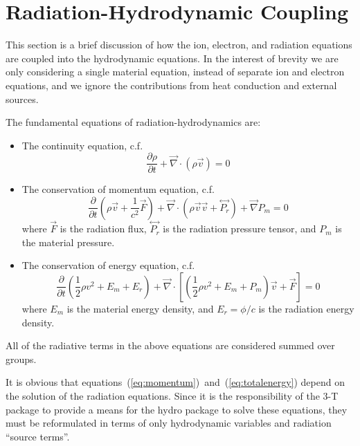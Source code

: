 \documentclass{article}
\newcommand{\partl}[2]{\ensuremath{\frac{\partial{#1}}{\partial{#2}}}}\newcommand{\del}{\ensuremath{\vec{\nabla}}}
\newcommand{\tensor}[1]{\ensuremath{\stackrel{\leftrightarrow}{#1}}}
\begin{document}
\section{Radiation-Hydrodynamic Coupling}

This section is a brief discussion of how the ion, electron, and radiation
equations are coupled into the hydrodynamic equations.
In the interest of brevity we are only considering a single material equation,
instead of separate ion and electron equations, and we ignore the contributions
from heat conduction and external sources.

The fundamental equations of radiation-hydrodynamics are:
\begin{itemize}
  \item The continuity equation, c.f.\ \cite[Eq.~(16)]{PomraningLAUR}
     \begin{equation}
        \partl{\rho}{t} + \del \cdot (\rho \vec{v}) = 0
     \label{eq:continuity}
     \end{equation}
  \item The conservation of momentum equation, c.f.\ \cite[Eq.~(17)]{PomraningLAUR}
     \begin{equation}
	\partl{}{t}\left( \rho \vec{v} + \frac{1}{c^2} \vec{F} \right)
	 + \del \cdot \left( \rho \vec{v} \vec{v} + \tensor{P_{r}} \right)
	 + \del P_{m}
	 = 0
     \label{eq:momentum}
     \end{equation}
     where $\vec{F}$ is the radiation flux,
     $\tensor{P_{r}}$ is the radiation pressure tensor,
     and $P_{m}$ is the material pressure.
  \item The conservation of energy equation,
          c.f.\ \cite[Eq.~(18)]{PomraningLAUR}
     \begin{equation}
	\partl{}{t}\left( \frac{1}{2} \rho v^2
                          + E_{m} + E_{r} \right)
	 + \del \cdot \left[
              \left( \frac{1}{2} \rho v^2 + E_{m} + P_{m} \right) \vec{v}
              + \vec{F} \right]
	 = 0
     \label{eq:totalenergy}
     \end{equation}
     where $E_{m}$ is the material energy density, and $E_{r} = \phi / c$
     is the radiation energy density.
\end{itemize}
All of the radiative terms in the above equations are considered summed
over groups.

It is obvious that equations~(\ref{eq:momentum})~and~(\ref{eq:totalenergy})
depend on the solution of the radiation equations.
Since it is the responsibility of the 3-T package to provide a means for
the hydro package to solve these equations, they must be reformulated
in terms of only hydrodynamic variables and radiation ``source terms''.
\end{document}
